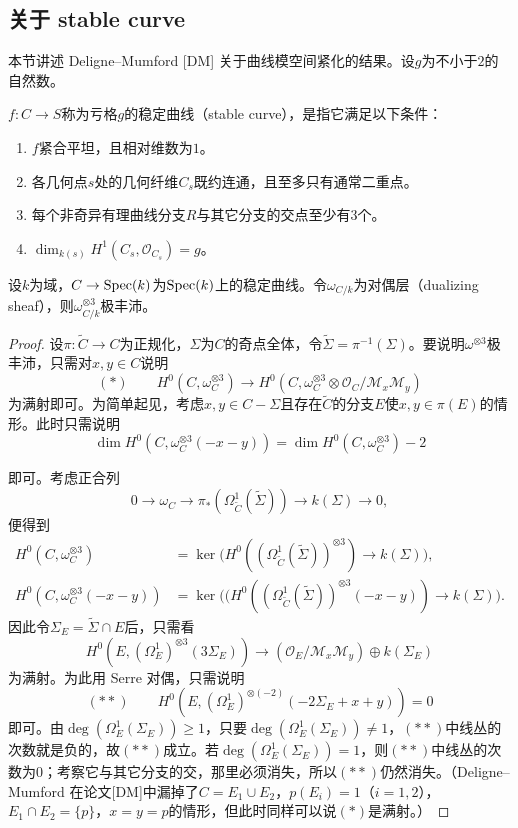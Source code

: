 \subsection{关于 stable curve}

本节讲述 Deligne--Mumford [DM] 关于曲线模空间紧化的结果。设$g$为不小于$2$的自然数。

\begin{definition}
$f:C\to S$称为亏格$g$的稳定曲线（stable curve），是指它满足以下条件：
\begin{enumerate}[label=(\arabic*)]
\item $f$紧合平坦，且相对维数为$1$。
\item 各几何点$s$处的几何纤维$C_s$既约连通，且至多只有通常二重点。
\item 每个非奇异有理曲线分支$R$与其它分支的交点至少有$3$个。
\item $\dim_{k(s)}H^1(C_s,\mathcal{O}_{C_s})=g$。
\end{enumerate}
\end{definition}

\begin{theorem}
设$k$为域，$C\to\operatorname{Spec}(k)$为$\operatorname{Spec}(k)$上的稳定曲线。令$\omega_{C/k}$为对偶层（dualizing sheaf），则$\omega_{C/k}^{\otimes3}$极丰沛。
\end{theorem}

\begin{proof}
设$\pi:\tilde C\to C$为正规化，$\Sigma$为$C$的奇点全体，令$\tilde\Sigma=\pi^{-1}(\Sigma)$。要说明$\omega^{\otimes3}$极丰沛，只需对$x,y\in C$说明
\[
(*)\qquad H^0(C,\omega_C^{\otimes3})\longrightarrow H^0(C,\omega_C^{\otimes3}\otimes\mathcal{O}_C/\mathcal{M}_x\mathcal{M}_y)
\]
为满射即可。为简单起见，考虑$x,y\in C-\Sigma$且存在$\tilde C$的分支$E$使$x,y\in\pi(E)$的情形。此时只需说明
\[
\dim H^0(C,\omega_C^{\otimes3}(-x-y))=\dim H^0(C,\omega_C^{\otimes3})-2
\]

即可。考虑正合列
\[
0\to\omega_C\to\pi_*(\Omega^1_{\tilde C}(\tilde\Sigma))\to k(\Sigma)\to0,
\]
便得到
\begin{align*}
H^0(C,\omega_C^{\otimes3})&=\ker\bigl(H^0((\Omega^1_{\tilde C}(\tilde\Sigma))^{\otimes3})\to k(\Sigma)\bigr),\\
H^0(C,\omega_C^{\otimes3}(-x-y))&=\ker\bigl((H^0((\Omega^1_{\tilde C}(\tilde\Sigma))^{\otimes3}(-x-y))\to k(\Sigma)\bigr).
\end{align*}
因此令$\Sigma_E=\tilde\Sigma\cap E$后，只需看
\[
H^0(E,(\Omega^1_E)^{\otimes3}(3\Sigma_E))\longrightarrow(\mathcal{O}_E/\mathcal{M}_x\mathcal{M}_y)\oplus k(\Sigma_E)
\]
为满射。为此用 Serre 对偶，只需说明
\[
(**)\qquad H^0(E,(\Omega^1_E)^{\otimes(-2)}(-2\Sigma_E+x+y))=0
\]
即可。由$\deg(\Omega^1_E(\Sigma_E))\ge1$，只要$\deg(\Omega^1_E(\Sigma_E))\ne1$，$(**)$中线丛的次数就是负的，故$(**)$成立。若$\deg(\Omega^1_E(\Sigma_E))=1$，则$(**)$中线丛的次数为$0$；考察它与其它分支的交，那里必须消失，所以$(**)$仍然消失。（Deligne--Mumford 在论文[DM]中漏掉了$C=E_1\cup E_2$，$p(E_i)=1$（$i=1,2$），$E_1\cap E_2=\{p\}$，$x=y=p$的情形，但此时同样可以说$(*)$是满射。）
\end{proof}


